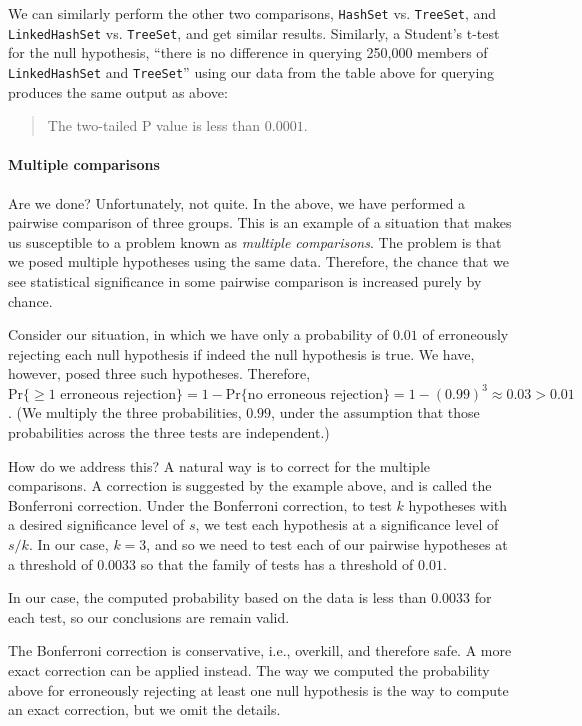 We can similarly perform the other two comparisons,
\texttt{HashSet} vs. \texttt{TreeSet}, and \texttt{LinkedHashSet}
 vs. \texttt{TreeSet}, and get
similar results. Similarly, a Student's t-test for the
null hypothesis, ``there is no difference in querying 250,000
members of \texttt{LinkedHashSet} and \texttt{TreeSet}'' using our data from
the table above for querying produces the same output as above:
\begin{quote}
    The two-tailed P value is less than $0.0001$.
\end{quote}

\paragraph{Multiple comparisons} Are we done? Unfortunately, not
quite. In the above, we have performed a pairwise comparison
of three groups. This is an example of a situation that makes
us susceptible to a problem known as \emph{multiple comparisons}.
The problem is that we posed multiple hypotheses using the same
data. Therefore, the chance that we see statistical significance
in some pairwise comparison is increased purely by chance.

Consider our situation, in which we have only a probability of
$0.01$ of erroneously rejecting each null hypothesis if indeed
the null hypothesis is true. We have, however, posed three
such hypotheses. Therefore,
$\text{Pr}\{\ge 1 \text{ erroneous rejection}\} =
1 - \text{Pr}\{\text{no erroneous rejection}\} =
1 - (0.99)^3 \approx 0.03 > 0.01$. (We multiply the three
probabilities, $0.99$, under the assumption that those
probabilities across the three tests are independent.)

How do we address this? A natural way is to correct
for the multiple comparisons. A correction is suggested
by the example above, and is called the Bonferroni
correction. Under the Bonferroni correction, to test
$k$ hypotheses with a desired significance level of
$s$, we test each hypothesis at a significance level
of $s/k$. In our case, $k=3$, and so we need to test
each of our pairwise hypotheses at a threshold of
$0.0033$ so that the family of tests has a threshold
of $0.01$.

In our case, the computed probability
based on the data is less than $0.0033$ for each test,
so our conclusions are remain valid.

The Bonferroni correction is conservative, i.e.,
overkill, and therefore safe. A more exact
correction can be applied instead. The way we computed the
probability above for erroneously rejecting at least
one null hypothesis is the way to compute an exact
correction, but we omit the details.

